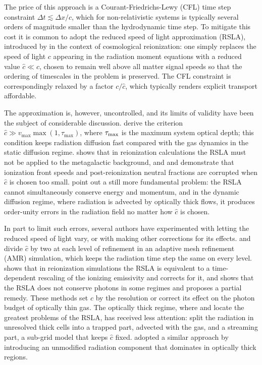 \documentclass[preprint,12pt,authoryear]{elsarticle}
\begin{document}
The price of this approach is a Courant-Friedrichs-Lewy (CFL) time step constraint $\Delta t \lesssim \Delta x / c$, which for non-relativistic systems is typically several orders of magnitude smaller than the hydrodynamic time step. To mitigate this cost it is common to adopt the reduced speed of light approximation (RSLA), introduced by \citet{Gnedin01a} in the context of cosmological reionization: one simply replaces the speed of light $c$ appearing in the radiation moment equations with a reduced value $\hat{c} \ll c$, chosen to remain well above all matter signal speeds so that the ordering of timescales in the problem is preserved. The CFL constraint is correspondingly relaxed by a factor $c/\hat{c}$, which typically renders explicit transport affordable.

The approximation is, however, uncontrolled, and its limits of validity have been the subject of considerable discussion. \citet{Skinner13a} derive the criterion $\hat{c} \gg v_{\max}\max(1, \tau_{\max})$, where $\tau_{\rm max}$ is the maximum system optical depth; this condition keeps radiation diffusion fast compared with the gas dynamics in the static diffusion regime. \citet{Gnedin16a} shows that in reionization calculations the RSLA must not be applied to the metagalactic background, and \citet{Deparis19a} and \citet{Ocvirk19a} demonstrate that ionization front speeds and post-reionization neutral fractions are corrupted when $\hat{c}$ is chosen too small. \citet{Wibking22a} point out a still more fundamental problem: the RSLA cannot simultaneously conserve energy and momentum, and in the dynamic diffusion regime, where radiation is advected by optically thick flows, it produces order-unity errors in the radiation field no matter how $\hat{c}$ is chosen.

In part to limit such errors, several authors have experimented with letting the reduced speed of light vary, or with making other corrections for its effects. \citet{Katz17a} and \citet{Rosdahl18a} divide $\hat{c}$ by two at each level of refinement in an adaptive mesh refinement (AMR) simulation, which keeps the radiation time step the same on every level. \citet{Cain24a} shows that in reionization simulations the RSLA is equivalent to a time-dependent rescaling of the ionizing emissivity and corrects for it, and \citet{Gnedin25a} shows that the RSLA does not conserve photons in some regimes and proposes a partial remedy. These methods set $\hat{c}$ by the resolution or correct its effect on the photon budget of optically thin gas. The optically thick regime, where \citet{Skinner13a} and \citet{Wibking22a} locate the greatest problems of the RSLA, has received less attention: \citet{Rosdahl15a} split the radiation in unresolved thick cells into a trapped part, advected with the gas, and a streaming part, a sub-grid model that keeps $\hat{c}$ fixed. \citet{2026ApJ...999..257K} adopted a similar approach by introducing an unmodified radiation component that dominates in optically thick regions.
\end{document}
